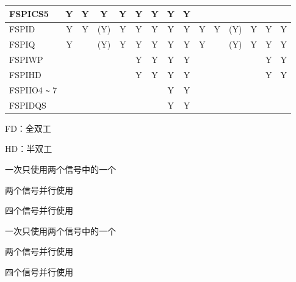 \documentclass[main\_\_CN.tex]{subfiles}
\begin{document}
\begin{landscape}
\begin{table}[H]
\begin{threeparttable}
\begin{tabular}{ |p{2.0cm} |c|c|c|c|c|c|c|c|c|c|c|c|c|c| }
FSPICS5                  & Y       & Y       & Y       & Y       & Y       & Y      & Y       & Y      &         &        &         &         &         &        \\ \hline
FSPID                    & Y       & Y       & (Y)\tnote{3}      & Y\tnote{4}      & Y\tnote{5}      & Y      & Y       & Y      & Y       & Y      & (Y)\tnote{6}      & Y\tnote{7}     & Y\tnote{8}     & Y      \\ \hline
FSPIQ                    & Y       &         & (Y)\tnote{3}      & Y\tnote{4}      & Y\tnote{5}      & Y       & Y      & Y      & Y       &        & (Y)\tnote{6}     & Y\tnote{7}     & Y\tnote{8}      & Y      \\ \hline
FSPIWP                   &         &         &         &         & Y\tnote{5}      & Y       & Y      & Y      &         &        &         &         & Y\tnote{8}       & Y      \\ \hline
FSPIHD                   &         &         &         &         & Y\tnote{5}      & Y       & Y      & Y      &         &        &         &         & Y\tnote{8}       & Y      \\ \hline
FSPIIO4 \verb+~+ 7 &         &         &         &         &       &        & Y      & Y      &         &        &         &         &        &      \\ \hline
FSPIDQS &         &         &         &         &       &        & Y      & Y      &         &        &         &         &        &      \\ \hline
\end{tabular}

                \begin{tablenotes}
                \item[1] FD：全双工
                \item[2] HD：半双工
                \item[3] 一次只使用两个信号中的一个
                \item[4] 两个信号并行使用
                \item[5] 四个信号并行使用
                \item[6] 一次只使用两个信号中的一个
                \item[7] 两个信号并行使用
                \item[8] 四个信号并行使用
        \end{tablenotes}
     \end{threeparttable}
    \end{table}



\end{landscape}
\end{document}
